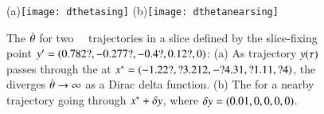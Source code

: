 


 \begin{figure}
(a)\texttt{[image: dthetasing]}%
(b)\texttt{[image: dthetanearsing]}%
 \caption{\label{fig:dthetasing}
The {\groupVel} $\dot{{\bf \theta}}$ for two \cLf\
\reducedsp\ trajectories in a slice defined by the slice-fixing
point ${y'}=(0.782?,-0.277?,-0.4?,0.12?,0)$:
 (a) As trajectory $y(\tau)$ passes through the
{\sset} 
 at $x^*=(-1.22?, ?3.212, -?4.31, ?1.11, ?4)$,
the {\groupVel} diverges
$\dot{{\bf \theta}} \to \infty$ as a Dirac delta function.
(b) The {\groupVel} for a nearby trajectory going
through $x^*+\delta y$,
where $\delta y=(0.01,0,0,0,0)$.
 }%
 \end{figure}

